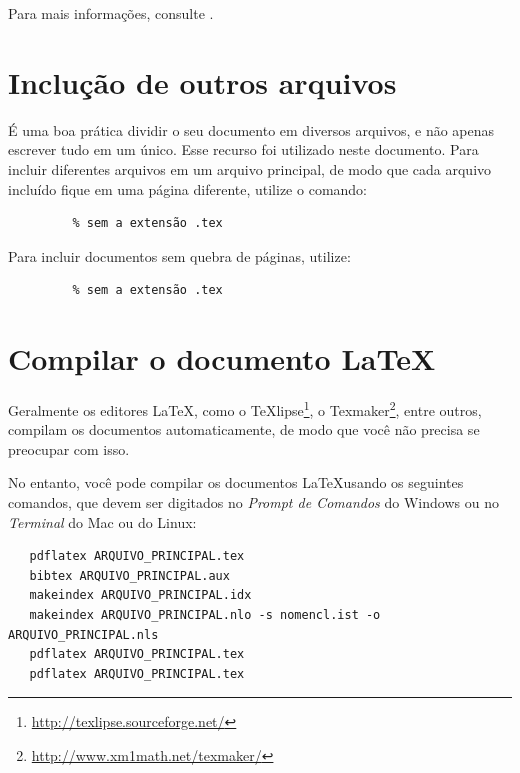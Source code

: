 Para mais informações, consulte .


\section{Inclução de outros arquivos}\label{sec:include}

É uma boa prática dividir o seu documento em diversos arquivos, e não apenas escrever tudo em um único.
  Esse recurso foi utilizado neste documento.
  Para incluir diferentes arquivos em um arquivo principal, de modo que cada arquivo incluído fique em uma página diferente, utilize o comando:
\begin{verbatim}
         % sem a extensão .tex
\end{verbatim}

Para incluir documentos sem quebra de páginas, utilize:
\begin{verbatim}
         % sem a extensão .tex
\end{verbatim}


\section{Compilar o documento \LaTeX}

Geralmente os editores \LaTeX, como o TeXlipse\footnote{\url{http://texlipse.sourceforge.net/}}, o Texmaker\footnote{\url{http://www.xm1math.net/texmaker/}}, entre outros, compilam os documentos automaticamente, de modo que você não precisa se preocupar com isso.

No entanto, você pode compilar os documentos \LaTeX usando os seguintes comandos, que devem ser digitados no \emph{Prompt de Comandos} do Windows ou no \emph{Terminal} do Mac ou do Linux:
\begin{verbatim}
   pdflatex ARQUIVO_PRINCIPAL.tex
   bibtex ARQUIVO_PRINCIPAL.aux
   makeindex ARQUIVO_PRINCIPAL.idx
   makeindex ARQUIVO_PRINCIPAL.nlo -s nomencl.ist -o ARQUIVO_PRINCIPAL.nls
   pdflatex ARQUIVO_PRINCIPAL.tex
   pdflatex ARQUIVO_PRINCIPAL.tex
\end{verbatim}
